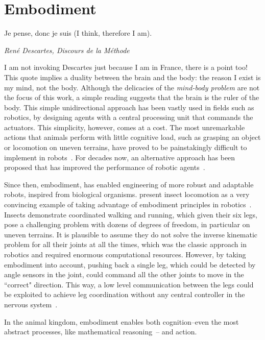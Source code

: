 \section{Embodiment}
\label{ch:intro:Embodiment}
\epigraph{Je pense, donc je suis (I think, therefore I am).}
{\textit{ Ren\'{e} Descartes, Discours de la M\'{e}thode}}
\noindent
I am not invoking Descartes just because I am in France, there is a point too!
This quote implies a duality between the brain and the body: the reason I exist is my mind, not the body.
Although the delicacies of the \emph{mind-body problem} are not the focus of this work, a simple reading suggests that the brain is the ruler of the body.
This simple unidirectional approach has been vastly used in fields such as robotics, by designing agents with a central processing unit that commands the actuators.
This simplicity, however, comes at a cost.
The most unremarkable actions that animals perform with little cognitive load, such as grasping an object or locomotion on uneven terrains, have proved to be painstakingly difficult to implement in robots~\cite{Pfeifer2006Book}.
For decades now, an alternative approach has been proposed that has improved the performance of robotic agents~\cite{Brooks1991AI}.
\par
Since then, embodiment\footnotemark, has enabled engineering of more robust and adaptable robots, inspired from biological organisms.
\citeauthor{Pfeifer2007Sci} present insect locomotion as a very convincing example of taking advantage of embodiment principles in robotics~\cite{Pfeifer2007Sci}.
Insects demonstrate coordinated walking and running, which given their six legs, pose a challenging problem with dozens of degrees of freedom, in particular on uneven terrains.
It is plausible to assume they do not solve the inverse kinematic problem for all their joints at all the times, which was the classic approach in robotics and required enormous computational resources.
However, by taking embodiment into account, pushing back a single leg, which could be detected by angle sensors in the joint, could command all the other joints to move in the ``correct" direction.
This way, a low level communication between the legs could be exploited to achieve leg coordination without any central controller in the nervous system~\cite{Pfeifer2007Sci}.
\par
In the animal kingdom, embodiment enables both cognition--even the most abstract processes, like mathematical reasoning~\cite{Lakoff2000Book}-- and action.
